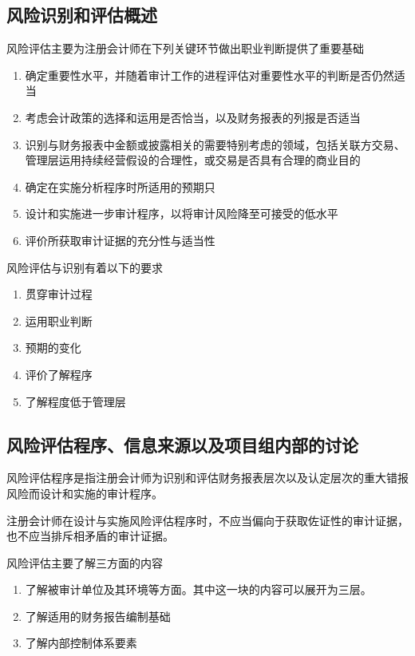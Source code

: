 \documentclass[UTF8,12pt]{ctexart}
\numberwithin{equation}{section} %
\numberwithin{figure}{section}
\numberwithin{table}{section}
\begin{document}
	\subsection{风险识别和评估概述}
	风险评估主要为注册会计师在下列关键环节做出职业判断提供了重要基础
	\begin{enumerate}
		\item 确定重要性水平，并随着审计工作的进程评估对重要性水平的判断是否仍然适当
		
		\item 考虑会计政策的选择和运用是否恰当，以及财务报表的列报是否适当
		
		\item 识别与财务报表中金额或披露相关的需要特别考虑的领域，包括关联方交易、管理层运用持续经营假设的合理性，或交易是否具有合理的商业目的
		
		\item 确定在实施分析程序时所适用的预期只
		
		\item 设计和实施进一步审计程序，以将审计风险降至可接受的低水平
		
		\item 评价所获取审计证据的充分性与适当性
	\end{enumerate}
	
	风险评估与识别有着以下的要求
	\begin{enumerate}
		\item 贯穿审计过程
		
		\item 运用职业判断
		
		\item 预期的变化
		
		\item 评价了解程序
		
		\item 了解程度低于管理层
	\end{enumerate}
	
	
	\subsection{风险评估程序、信息来源以及项目组内部的讨论}
	风险评估程序是指注册会计师为识别和评估财务报表层次以及认定层次的重大错报风险而设计和实施的审计程序。
	
	注册会计师在设计与实施风险评估程序时，不应当偏向于获取佐证性的审计证据，也不应当排斥相矛盾的审计证据。
	
	风险评估主要了解三方面的内容
	\begin{enumerate}
		\item 了解被审计单位及其环境等方面。其中这一块的内容可以展开为三层。
		
		\item 了解适用的财务报告编制基础
		
		\item 了解内部控制体系要素
	\end{enumerate}
	
\end{document}
